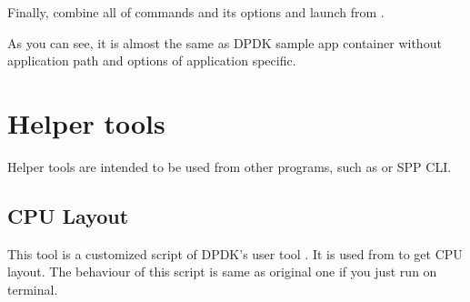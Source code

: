 \documentclass[a4paper,11pt,openany,oneside,english]{sphinxmanual}
\begin{document}
Finally, combine all of commands and its options and launch
from .

\begin{sphinxVerbatim}[commandchars=\\\{\},formatcom=\footnotesize]
      \PYG{p}{[} \PYG{p}{]}  \PYGZbs{}
        
 \PYG{p}{[}\PYG{p}{]}  

   

   
\end{sphinxVerbatim}

As you can see, it is almost the same as DPDK sample app container
without application path and options of application specific.


\section{Helper tools}
\label{\detokenize{tools/helpers/index:helper-tools}}\label{\detokenize{tools/helpers/index:spp-tools-helpers-index}}\label{\detokenize{tools/helpers/index::doc}}
Helper tools are intended to be used from other programs, such as 
or SPP CLI.


\subsection{CPU Layout}
\label{\detokenize{tools/helpers/tools:cpu-layout}}\label{\detokenize{tools/helpers/tools:spp-tools-helpers-tools}}\label{\detokenize{tools/helpers/tools::doc}}
This tool is a customized script of DPDK’s user tool . It is
used from  to get CPU layout. The behaviour of this script is same
as original one if you just run on terminal.
\end{document}
